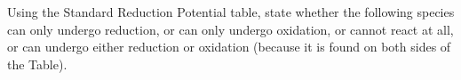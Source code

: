 \documentclass[fleqn]{exam}
\begin{document}
\begin{questions}
  \setcounter{question}{6}

  \question Using the Standard Reduction Potential table, state whether the following species \newline
  can only undergo reduction, or \newline
  can only undergo oxidation, or \newline
  cannot react at all, or \newline
  can undergo either reduction or oxidation (because it is found on both sides of the Table). \newline
\end{questions}
\end{document}
